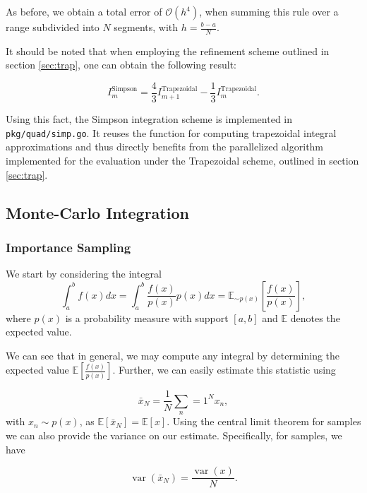 \documentclass[10pt, a4paper]{article}
\begin{document}
  As before, we obtain a total error of $\mathcal{O}(h^4)$, when summing this rule over a range subdivided
  into $N$ segments, with $h = \frac{b-a}{N}$.

  It should be noted that when employing the refinement scheme outlined in section \ref{sec:trap},
  one can obtain the following result\cite{nr}:

  \begin{equation}
  I_m^{\text{Simpson}} = \frac{4}{3} I_{m+1}^{\text{Trapezoidal}} - \frac{1}{3} I_m^{\text{Trapezoidal}}.
  \end{equation}

  Using this fact, the Simpson integration scheme is implemented in \texttt{pkg/quad/simp.go}. It
  reuses the function for computing trapezoidal integral approximations and thus directly benefits from
  the parallelized algorithm implemented for the evaluation under the Trapezoidal scheme, outlined in
  section \ref{sec:trap}.

\subsection{Monte-Carlo Integration}
  \subsubsection{Importance Sampling}
  We start by considering the integral
  \begin{equation}
  \int_a^b f(x) dx = \int_{a}^{b} \frac{f(x)}{p(x)} p(x) dx = \mathbb{E}_{\sim p(x)}\left[ \frac{f(x)}{p(x)} \right],
  \end{equation}
  where $p(x)$ is a probability measure with support $[a, b]$ and $\mathbb{E}$ denotes the expected
  value.

  We can see that in general, we may compute any integral by determining the expected value
  $\mathbb{E}\left[ \frac{f(x)}{p(x)} \right]$. Further, we can easily estimate this
  statistic using

  \begin{equation}
  \bar{x}_N = \frac{1}{N} \sum_n=1^N x_n,
  \end{equation}
  with $x_n \sim p(x)$, as $\mathbb{E}[\bar{x}_N] = \mathbb{E}[x]$. Using the central limit theorem for
  \iid{} samples we can also provide the variance on our estimate. Specifically, for \iid{} samples,
  we have

  \begin{equation}
  \label{eq:var}
  \operatorname{var}(\bar{x}_N) = \frac{\operatorname{var}(x)}{N}.
  \end{equation}
\end{document}
